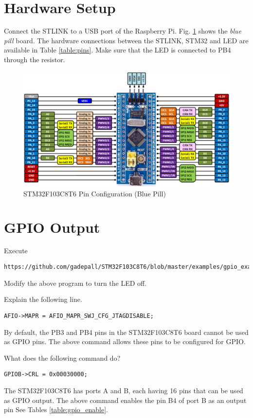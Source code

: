 \documentclass[journal,12pt,twocolumn]{IEEEtran}
\begin{document}
\section{Hardware Setup}
Connect the STLINK to a USB port of the Raspberry Pi.  Fig. \ref{fig:stm_blue} shows the {\em blue pill} board. The hardware connections between the STLINK, STM32 and LED are available in Table \ref{table:pins}. Make sure that the LED is connected to PB4 through the resistor.
\begin{table}[!h]
\centering

\caption{}
\label{table:pins}
\end{table}
%
\begin{figure}[!h]
\centering
\includegraphics[width=\columnwidth]{./figs/stm_blue.eps}
\caption{STM32F103C8T6 Pin Configuration (Blue Pill)}
\label{fig:stm_blue}
\end{figure}

\section{GPIO Output}
%
\begin{problem}
Execute 
\begin{lstlisting}
https://github.com/gadepall/STM32F103C8T6/blob/master/examples/gpio_example.c
\end{lstlisting}
\end{problem}
\begin{problem}
Modify the above program to turn the LED off.
\end{problem}
\begin{problem}
Explain the following line.
\begin{lstlisting}
AFIO->MAPR = AFIO_MAPR_SWJ_CFG_JTAGDISABLE;
\end{lstlisting}
\end{problem}
\solution By default, the PB3 and PB4 pins in the STM32F103C8T6 board cannot be used as GPIO pins.  The above
command allows these pins to be configured for GPIO.
\begin{problem}
What does the following command do?
\begin{lstlisting}
GPIOB->CRL = 0x00030000;	
\end{lstlisting}
\end{problem}
\solution The STM32F103C8T6 has ports A and B, each  having 16 pins that can be used as GPIO output.  The above command enables the pin B4 of port B as an output pin
See Tables \ref{table:gpio_enable}.
\end{document}
